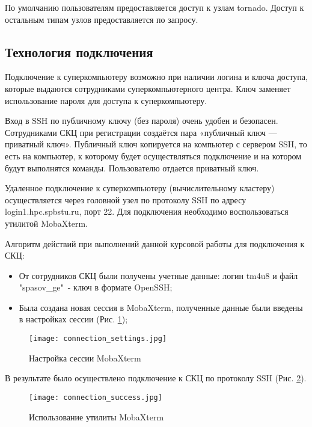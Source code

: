 \documentclass[a4paper, 12pt]{article}
\begin{document}
    По умолчанию пользователям предоставляется доступ к узлам tornado. Доступ к
    остальным типам узлов предоставляется по запросу.
    
    \subsection{Технология подключения}
    Подключение к суперкомпьютеру возможно при наличии логина и ключа доступа, которые выдаются сотрудниками суперкомпьютерного центра. Ключ заменяет использование пароля для доступа к суперкомпьютеру. 
    
    Вход в SSH по публичному ключу (без пароля) очень удобен и безопасен. Сотрудниками СКЦ при регистрации создаётся пара «публичный ключ — приватный ключ». Публичный ключ копируется на компьютер с сервером SSH, то есть на компьютер, к которому будет осуществляться подключение и на котором будут выполнятся команды. 
    Пользователю отдается приватный ключ.
    
    Удаленное подключение к суперкомпьютеру (вычислительному кластеру) осуществляется через головной узел по протоколу SSH по адресу login1.hpc.spbstu.ru, порт 22. Для подключения необходимо воспользоваться утилитой MobaXterm. 

    Алгоритм действий при выполнений данной курсовой работы для подключения к СКЦ:
    \begin{itemize}
        \item От сотрудников СКЦ были получены учетные данные: логин tm4u8 и файл "spasov\_ge"\, - ключ в формате OpenSSH;
        \item Была создана новая сессия в MobaXterm, полученные данные были введены в настройках сессии (Рис. \ref{session_settings});
    \end{itemize}
        
    \begin{figure}[h!]
        \centering
        \texttt{[image: connection\_settings.jpg]}
        \caption{Настройка сессии MobaXterm}	
        \label{session_settings}
    \end{figure}

    В результате было осуществлено подключение к СКЦ по протоколу SSH (Рис. \ref{connection_success}).

    \begin{figure}[h!]
        \centering
        \texttt{[image: connection\_success.jpg]}
        \caption{Использование утилиты MobaXterm}	
        \label{connection_success}
    \end{figure}
\end{document}
